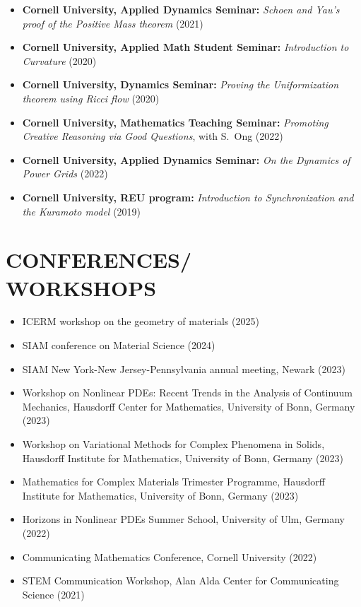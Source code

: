 \documentclass[margin]{res} %
\begin{document}
\begin{resume}
\begin{itemize}
	\item \textbf{Cornell University, Applied Dynamics Seminar:} \textit{Schoen and Yau's proof of the Positive Mass theorem} (2021)
	\item \textbf{Cornell University, Applied Math Student Seminar:} \textit{Introduction to Curvature} (2020)
	\item \textbf{Cornell University, Dynamics Seminar:} \textit{Proving the Uniformization theorem using Ricci flow} (2020)
	\item \textbf{Cornell University, Mathematics Teaching Seminar:} \textit{Promoting Creative Reasoning via Good Questions}, with S.~Ong (2022)
	\item \textbf{Cornell University, Applied Dynamics Seminar:} \textit{On the Dynamics of Power Grids} (2022)
	\item \textbf{Cornell University, REU program:} \textit{Introduction to Synchronization and the Kuramoto model} (2019)
\end{itemize}

\section{CONFERENCES/\\WORKSHOPS}
\begin{itemize}
	\item ICERM workshop on the geometry of materials (2025)
	\item SIAM conference on Material Science (2024)
	\item SIAM New York-New Jersey-Pennsylvania annual meeting, Newark (2023)
	\item Workshop on Nonlinear PDEs: Recent Trends in the Analysis of Continuum Mechanics, Hausdorff Center for Mathematics, University of Bonn, Germany (2023)
	\item Workshop on Variational Methods for Complex Phenomena in Solids, Hausdorff Institute for Mathematics, University of Bonn, Germany (2023)
	\item Mathematics for Complex Materials Trimester Programme, Hausdorff Institute for Mathematics, University of Bonn, Germany (2023)
	\item Horizons in Nonlinear PDEs Summer School, University of Ulm, Germany (2022)
	\item Communicating Mathematics Conference, Cornell University (2022)
	\item STEM Communication Workshop, Alan Alda Center for Communicating Science (2021)
\end{itemize}


\end{resume}
\end{document}
